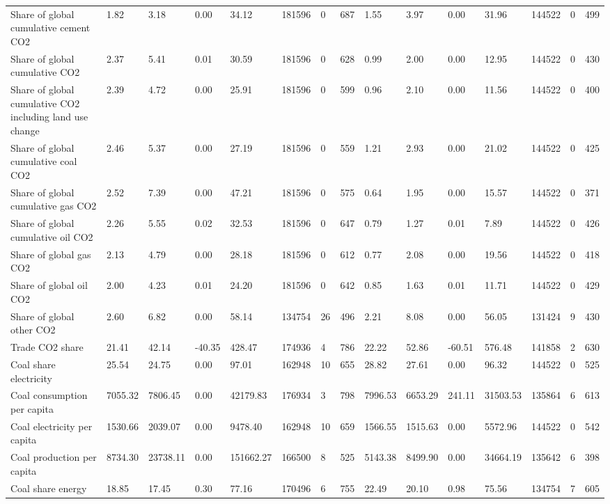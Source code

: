\begin{longtable}{lllllllllllllll}
\addlinespace
Share of global cumulative cement CO2 & 1.82 & 3.18 & 0.00 & 34.12 & 181596 & 0 & 687 & 1.55 & 3.97 & 0.00 & 31.96 & 144522 & 0 & 499\\
Share of global cumulative CO2 & 2.37 & 5.41 & 0.01 & 30.59 & 181596 & 0 & 628 & 0.99 & 2.00 & 0.00 & 12.95 & 144522 & 0 & 430\\
Share of global cumulative CO2 including land use change & 2.39 & 4.72 & 0.00 & 25.91 & 181596 & 0 & 599 & 0.96 & 2.10 & 0.00 & 11.56 & 144522 & 0 & 400\\
Share of global cumulative coal CO2 & 2.46 & 5.37 & 0.00 & 27.19 & 181596 & 0 & 559 & 1.21 & 2.93 & 0.00 & 21.02 & 144522 & 0 & 425\\
Share of global cumulative gas CO2 & 2.52 & 7.39 & 0.00 & 47.21 & 181596 & 0 & 575 & 0.64 & 1.95 & 0.00 & 15.57 & 144522 & 0 & 371\\
\addlinespace
Share of global cumulative oil CO2 & 2.26 & 5.55 & 0.02 & 32.53 & 181596 & 0 & 647 & 0.79 & 1.27 & 0.01 & 7.89 & 144522 & 0 & 426\\
Share of global gas CO2 & 2.13 & 4.79 & 0.00 & 28.18 & 181596 & 0 & 612 & 0.77 & 2.08 & 0.00 & 19.56 & 144522 & 0 & 418\\
Share of global oil CO2 & 2.00 & 4.23 & 0.01 & 24.20 & 181596 & 0 & 642 & 0.85 & 1.63 & 0.01 & 11.71 & 144522 & 0 & 429\\
Share of global other CO2 & 2.60 & 6.82 & 0.00 & 58.14 & 134754 & 26 & 496 & 2.21 & 8.08 & 0.00 & 56.05 & 131424 & 9 & 430\\
Trade CO2 share & 21.41 & 42.14 & -40.35 & 428.47 & 174936 & 4 & 786 & 22.22 & 52.86 & -60.51 & 576.48 & 141858 & 2 & 630\\
\addlinespace
Coal share electricity & 25.54 & 24.75 & 0.00 & 97.01 & 162948 & 10 & 655 & 28.82 & 27.61 & 0.00 & 96.32 & 144522 & 0 & 525\\
Coal consumption per capita & 7055.32 & 7806.45 & 0.00 & 42179.83 & 176934 & 3 & 798 & 7996.53 & 6653.29 & 241.11 & 31503.53 & 135864 & 6 & 613\\
Coal electricity per capita & 1530.66 & 2039.07 & 0.00 & 9478.40 & 162948 & 10 & 659 & 1566.55 & 1515.63 & 0.00 & 5572.96 & 144522 & 0 & 542\\
Coal production per capita & 8734.30 & 23738.11 & 0.00 & 151662.27 & 166500 & 8 & 525 & 5143.38 & 8499.90 & 0.00 & 34664.19 & 135642 & 6 & 398\\
Coal share energy & 18.85 & 17.45 & 0.30 & 77.16 & 170496 & 6 & 755 & 22.49 & 20.10 & 0.98 & 75.56 & 134754 & 7 & 605\\

\end{longtable}
